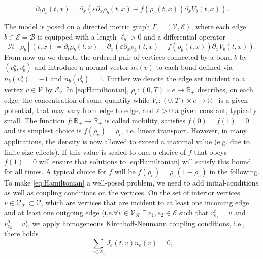 \begin{equation} 
    \label{Drift-Diffusion-equation}
    \partial_t \rho_b (t,x) = \partial_x (\varepsilon \partial_x \rho_b (t,x) - f(\rho_b (t,x) ) \partial_x V_b (t,x)).
\end{equation}


The model is posed on a directed metric graph $\Gamma = (\mathcal{V}, \mathcal{E})$, where each edge $b \in \mathcal{E} = \mathcal{B}$ is equipped with a length $\ell_b > 0$ and a differential operator
\begin{equation} 
    \label{eq:Hamiltonian}
    \mathcal{H} [\rho_b] (t,x) \coloneqq \partial_t \rho_b (t,x)  - \partial_x (\varepsilon \partial_x \rho_b (t,x) + f(\rho_b (t,x) ) \partial_x V_b (t,x)).
\end{equation}
From now on we denote the ordered pair of vertices connected by a bond $b$ by $(v^{o}_b, v^{t}_b)$ and introduce a normal vector $n_b(v)$ to each bond defined via $n_b(v^{o}_b) = -1$ and $n_b(v^{t}_b) = 1$. Further we denote the edge set incident to a vertex $v \in \mathcal{V}$ by $\mathcal{E}_v$. In \cref{eq:Hamiltonian}, $\rho_e \colon (0,T) \times e \to \mathbb{R}_{+}$ describes, on each edge, the concentration of some quantity while $V_e \colon (0,T) \times e \to \mathbb{R}_{+}$ is a given potential, that may vary from edge to edge, and $\varepsilon > 0$ a given constant, typically small. The function $f \colon \mathbb{R}_{+} \to \mathbb{R}_{+}$ is called mobility, satisfies $f(0) = f(1) = 0$ and its simplest choice is $f(\rho_e) = \rho_e$, i.e. linear transport. However, in many applications, the density is now allowed to exceed a maximal value (e.g. due to finite size effects). If this value is scaled to one, a choice of $f$ that obeys $f(1) = 0$ will ensure that solutions to \eqref{eq:Hamiltonian} will satisfy this bound for all times. A typical choice for $f$ will be $f(\rho_e) = \rho_e(1-\rho_e)$ in the following. \\
To make \cref{eq:Hamiltonian} a well-posed problem, we need to add initial-conditions as well as coupling conditions on the vertices. On the set of interior vertices $v \in \mathcal{V}_\mathcal{K} \subset \mathcal{V}$, which are vertices that are incident to at least one incoming edge and at least one outgoing edge (i.e.$\forall v \in \mathcal{V}_\mathcal{K} \; \exists \ e_1, e_2 \in \mathcal{E}$ such that $v^{t}_{e_1} = v$ and $v^{o}_{e_2} = v$), we apply homogeneous Kirchhoff-Neumann coupling conditions, i.e., there holds
\begin{equation}
    \label{eq:Kirchhoff_Neumann_condition}
    \sum_{e\in \mathcal{E}_v} J_e(t,v) n_e (v)=0,
\end{equation}
